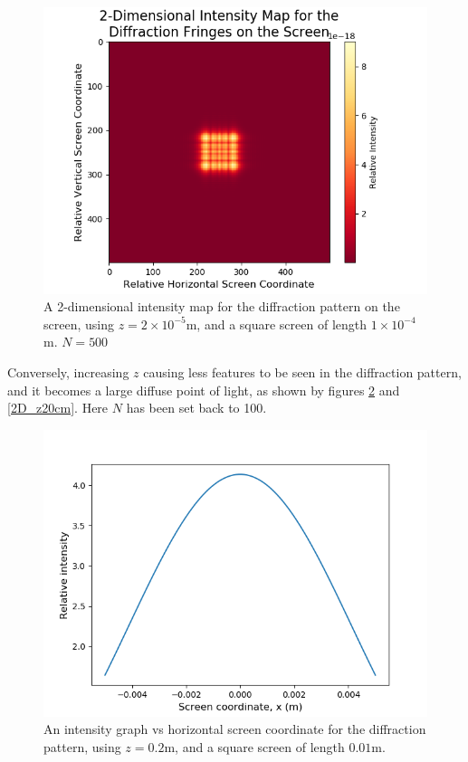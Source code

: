 \documentclass[twocolumn,prl,nobalancelastpage,aps,10pt]{revtex4-1}
\begin{document}
\begin{figure}
	\includegraphics*[width=0.96\linewidth,clip]{2D_z2e-5_N500}
	\caption{A 2-dimensional intensity map for the diffraction pattern on the screen, using $z = 2\times10^{-5}$m, and a square screen of length $1\times10^{-4}$m. $N=500$} \label{2D_smallerZ_highN}
\end{figure}

Conversely, increasing $z$ causing less features to be seen in the diffraction pattern, and it becomes a large diffuse point of light, as shown by figures \ref{1D_z20cm} and \ref{2D_z20cm}. Here $N$ has been set back to 100.

\begin{figure}[!ht]
	\includegraphics*[width=0.96\linewidth,clip]{1D_z20cm}
	\caption{An intensity graph vs horizontal screen coordinate for the diffraction pattern, using $z = 0.2$m, and a square screen of length $0.01$m.} \label{1D_z20cm}
\end{figure}
\end{document}
